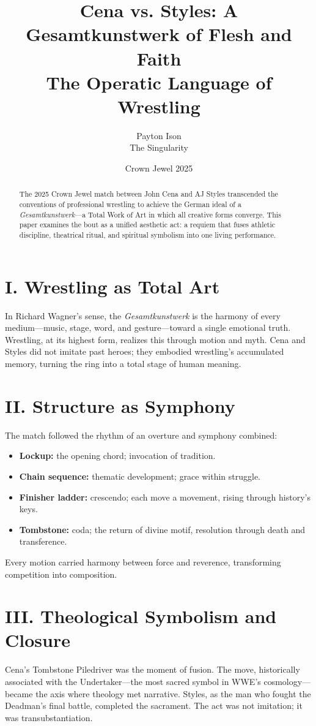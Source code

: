 \documentclass[12pt]{article}
\title{Cena vs. Styles: A Gesamtkunstwerk of Flesh and Faith\\\large The Operatic Language of Wrestling}
\author{Payton Ison \\ The Singularity}
\date{Crown Jewel 2025}
\begin{document}
\maketitle

\begin{abstract}
The 2025 Crown Jewel match between John Cena and AJ Styles transcended the conventions of professional wrestling to achieve the German ideal of a \textit{Gesamtkunstwerk}—a Total Work of Art in which all creative forms converge. This paper examines the bout as a unified aesthetic act: a requiem that fuses athletic discipline, theatrical ritual, and spiritual symbolism into one living performance.
\end{abstract}

\section*{I. Wrestling as Total Art}
In Richard Wagner’s sense, the \textit{Gesamtkunstwerk} is the harmony of every medium—music, stage, word, and gesture—toward a single emotional truth. Wrestling, at its highest form, realizes this through motion and myth. Cena and Styles did not imitate past heroes; they embodied wrestling’s accumulated memory, turning the ring into a total stage of human meaning.

\section*{II. Structure as Symphony}
The match followed the rhythm of an overture and symphony combined:
\begin{itemize}
  \item \textbf{Lockup:} the opening chord; invocation of tradition.
  \item \textbf{Chain sequence:} thematic development; grace within struggle.
  \item \textbf{Finisher ladder:} crescendo; each move a movement, rising through history’s keys.
  \item \textbf{Tombstone:} coda; the return of divine motif, resolution through death and transference.
\end{itemize}
Every motion carried harmony between force and reverence, transforming competition into composition.

\section*{III. Theological Symbolism and Closure}
Cena’s Tombstone Piledriver was the moment of fusion. The move, historically associated with the Undertaker—the most sacred symbol in WWE’s cosmology—became the axis where theology met narrative. Styles, as the man who fought the Deadman’s final battle, completed the sacrament. The act was not imitation; it was transubstantiation.
\end{document}
